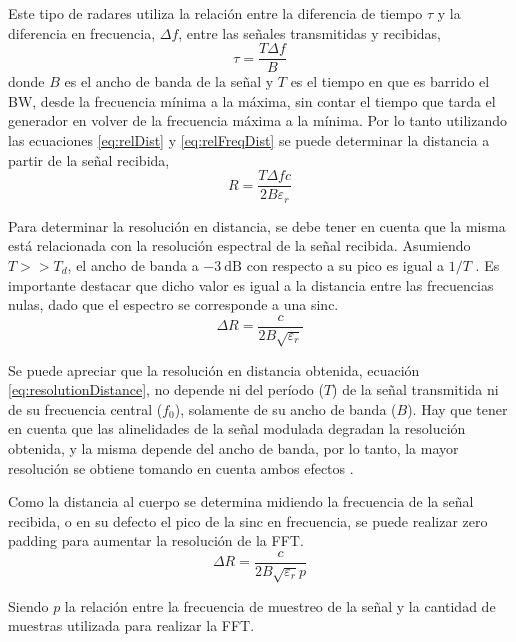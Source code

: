 Este tipo de radares utiliza la relación entre la diferencia de tiempo $\tau$ y la diferencia en frecuencia, $\Delta f$, entre las señales transmitidas y recibidas,
\begin{equation}\label{eq:relFreqDist}
  \tau = \dfrac{T\Delta f}{B}
\end{equation}
donde $B$ es el ancho de banda de la señal y $T$ es el tiempo en que es barrido el BW, desde la frecuencia mínima a la máxima, sin contar el tiempo que tarda el generador en volver de la frecuencia máxima a la mínima. Por lo tanto utilizando las ecuaciones \ref{eq:relDist} y \ref{eq:relFreqDist} se puede determinar la distancia a partir de la señal recibida,
\begin{equation}\label{eq:receivedDist}
  R = \dfrac{T\Delta fc}{2B\varepsilon_r}
\end{equation}

Para determinar la resolución en distancia, se debe tener en cuenta que la misma está relacionada con la resolución espectral de la señal recibida. Asumiendo $T >> T_d$, el ancho de banda a $\SI{-3}{\dB}$ con respecto a su pico es igual a $1/T$ \cite{Brooker2005}. Es importante destacar que dicho valor es igual a la distancia entre las frecuencias nulas, dado que el espectro se corresponde a una sinc.
\begin{equation}\label{eq:resolutionDistance}
  \Delta R = \dfrac{c}{2B\sqrt{\varepsilon_r}}
\end{equation}

Se puede apreciar que la resolución en distancia obtenida, ecuación \ref{eq:resolutionDistance}, no depende ni del período ($T$) de la señal transmitida ni de su frecuencia central ($f_0$), solamente de su ancho de banda ($B$). Hay que tener en cuenta que las alinelidades de la señal modulada degradan la resolución obtenida, y la misma depende del ancho de banda, por lo tanto, la mayor resolución se obtiene tomando en cuenta ambos efectos \cite{Brooker2005}.

Como la distancia al cuerpo se determina midiendo la frecuencia de la señal recibida, o en su defecto el pico de la sinc en frecuencia, se puede realizar zero padding para aumentar la resolución de la FFT.
\begin{equation}\label{eq:resolutionDistance2}
  \Delta R = \dfrac{c}{2B\sqrt{\varepsilon_r}p}
\end{equation}

Siendo $p$ la relación entre la frecuencia de muestreo de la señal y la cantidad de muestras utilizada para realizar la FFT.

